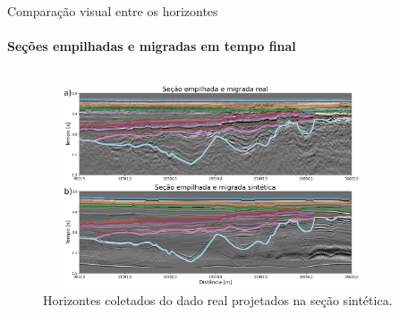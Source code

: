 \documentclass[xcolor=dvipsnames,t]{beamer}
\begin{document}
\begin{frame}{Comparação visual entre os horizontes}
	\framesubtitle{Seções empilhadas e migradas em tempo final}	
	
	\begin{columns}[onlytextwidth, T]
		\begin{column}{.9\textwidth}
			\begin{figure}[h]
				\includegraphics[width=10cm,height=6cm]{../imagens/comparision1HRZ.png}	
				\tiny{\caption{Horizontes coletados do dado real projetados na seção sintética.}} 	
			\end{figure}			
		\end{column}
	\end{columns}	
	
\end{frame}
\end{document}

